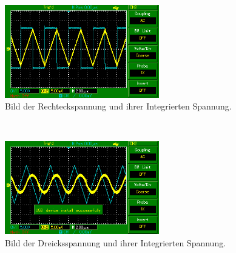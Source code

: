 \begin{figure}[h]
    \centering
    \includegraphics[width=0.6\textwidth]{MAP006.png}
    \caption{Bild der Rechteckspannung und ihrer Integrierten Spannung.}
    \label{abb:rechteck}
\end{figure}\\
\begin{figure}[h]
    \centering
    \includegraphics[width=0.6\textwidth]{MAP005.png}
    \caption{Bild der Dreicksspannung und ihrer Integrierten Spannung.}
    \label{abb:dreieck}
\end{figure}\\
